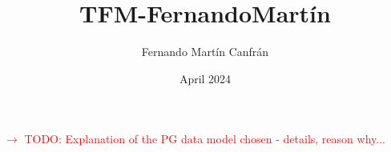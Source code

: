 \documentclass{article}
\title{TFM-FernandoMartín}
\author{Fernando Martín Canfrán}
\date{April 2024}
\begin{document}
\textcolor{red}{$\rightarrow$ TODO: Explanation of the PG data model chosen - details, reason why...}

\end{document}
